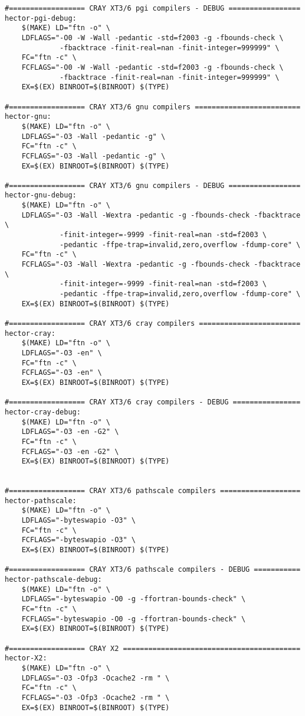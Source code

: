 \begin{verbatim}
#================== CRAY XT3/6 pgi compilers - DEBUG =================
hector-pgi-debug:
	$(MAKE) LD="ftn -o" \
	LDFLAGS="-O0 -W -Wall -pedantic -std=f2003 -g -fbounds-check \
	         -fbacktrace -finit-real=nan -finit-integer=999999" \
	FC="ftn -c" \
	FCFLAGS="-O0 -W -Wall -pedantic -std=f2003 -g -fbounds-check \
	         -fbacktrace -finit-real=nan -finit-integer=999999" \
	EX=$(EX) BINROOT=$(BINROOT) $(TYPE)

#================== CRAY XT3/6 gnu compilers =========================
hector-gnu:
	$(MAKE) LD="ftn -o" \
	LDFLAGS="-O3 -Wall -pedantic -g" \
	FC="ftn -c" \
	FCFLAGS="-O3 -Wall -pedantic -g" \
	EX=$(EX) BINROOT=$(BINROOT) $(TYPE)

#================== CRAY XT3/6 gnu compilers - DEBUG =================
hector-gnu-debug:
	$(MAKE) LD="ftn -o" \
	LDFLAGS="-O3 -Wall -Wextra -pedantic -g -fbounds-check -fbacktrace \
	         -finit-integer=-9999 -finit-real=nan -std=f2003 \
	         -pedantic -ffpe-trap=invalid,zero,overflow -fdump-core" \
	FC="ftn -c" \
	FCFLAGS="-O3 -Wall -Wextra -pedantic -g -fbounds-check -fbacktrace \
	         -finit-integer=-9999 -finit-real=nan -std=f2003 \
	         -pedantic -ffpe-trap=invalid,zero,overflow -fdump-core" \
	EX=$(EX) BINROOT=$(BINROOT) $(TYPE)

#================== CRAY XT3/6 cray compilers ========================
hector-cray:
	$(MAKE) LD="ftn -o" \
	LDFLAGS="-O3 -en" \
	FC="ftn -c" \
	FCFLAGS="-O3 -en" \
	EX=$(EX) BINROOT=$(BINROOT) $(TYPE)

#================== CRAY XT3/6 cray compilers - DEBUG ================
hector-cray-debug:
	$(MAKE) LD="ftn -o" \
	LDFLAGS="-O3 -en -G2" \
	FC="ftn -c" \
	FCFLAGS="-O3 -en -G2" \
	EX=$(EX) BINROOT=$(BINROOT) $(TYPE)


#================== CRAY XT3/6 pathscale compilers ===================
hector-pathscale:
	$(MAKE) LD="ftn -o" \
	LDFLAGS="-byteswapio -O3" \
	FC="ftn -c" \
	FCFLAGS="-byteswapio -O3" \
	EX=$(EX) BINROOT=$(BINROOT) $(TYPE)

#================== CRAY XT3/6 pathscale compilers - DEBUG ===========
hector-pathscale-debug:
	$(MAKE) LD="ftn -o" \
	LDFLAGS="-byteswapio -O0 -g -ffortran-bounds-check" \
	FC="ftn -c" \
	FCFLAGS="-byteswapio -O0 -g -ffortran-bounds-check" \
	EX=$(EX) BINROOT=$(BINROOT) $(TYPE)

#================== CRAY X2 ==========================================
hector-X2:
	$(MAKE) LD="ftn -o" \
	LDFLAGS="-O3 -Ofp3 -Ocache2 -rm " \
	FC="ftn -c" \
	FCFLAGS="-O3 -Ofp3 -Ocache2 -rm " \
	EX=$(EX) BINROOT=$(BINROOT) $(TYPE)


\end{verbatim}
